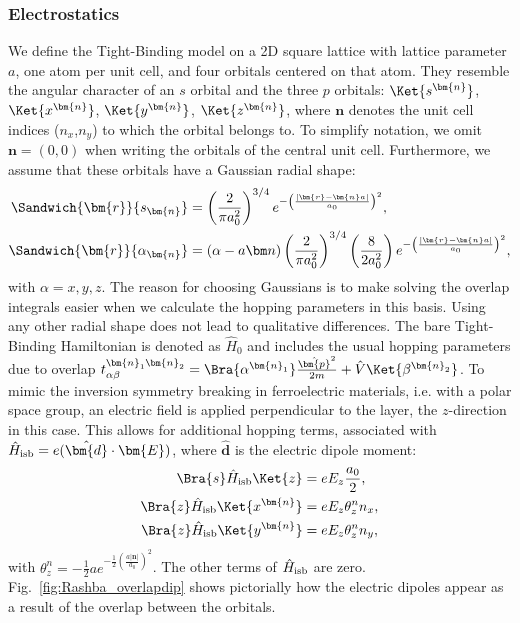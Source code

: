\subsubsection{Electrostatics \label{sec:tb_model}}
We define the Tight-Binding model on a 2D square lattice with lattice parameter $a$, one atom per unit cell, and four orbitals centered on that atom.
They resemble the angular character of an $s$ orbital and the three $p$ orbitals: $\Ket{s^{\bm{n}}}$, $\Ket{x^{\bm{n}}}$, $\Ket{y^{\bm{n}}}$, $\Ket{z^{\bm{n}}}$, where $\bm{n}$ denotes the unit cell indices ($n_x$,$n_y$) to which the orbital belongs to.
To simplify notation, we omit $\bm{n} = (0, 0)$ when writing the orbitals of the central unit cell.
Furthermore, we assume that these orbitals have a Gaussian radial shape:
\begin{align}
	\Sandwich{\bm{r}}{s_{\bm{n}}} &= \left(\frac{2}{\pi a_0^2}\right)^{3/4}e^{-\left(\frac{|\bm{r}-\bm{n}a|}{a_0}\right)^2},\\
\Sandwich{\bm{r}}{\alpha_{\bm{n}}} &= (\alpha - a\bm n)\left(\frac{2}{\pi a_0^2}\right)^{3/4}\left(\frac{8}{2a_0^2}\right) e^{-\left(\frac{|\bm{r}-\bm{n}a|}{a_0}\right)^2},
\end{align}
with $\alpha = x, y, z$.
The reason for choosing Gaussians is to make solving the overlap integrals easier when we calculate the hopping parameters in this basis.
Using any other radial shape does not lead to qualitative differences.
The bare Tight-Binding Hamiltonian is denoted as $\hat{H}_0$ and includes the usual hopping parameters due to overlap $t_{\alpha\beta}^{\bm{n}_1\bm{n}_2} = \Bra{\alpha^{\bm{n}_1}}\frac{\hat{\bm{p}}^2}{2m} + \hat{V}\Ket{\beta^{\bm{n}_2}}$.
To mimic the inversion symmetry breaking in ferroelectric materials, i.e. with a polar space group, an electric field is applied perpendicular to the layer, the $z$-direction in this case.
This allows for additional hopping terms, associated with $\hat{H}_{\rm isb} = e (\hat{\bm{d}}\cdot \bm{E})$, where $\hat{\bm{d}}$ is the electric dipole moment:
\begin{align}
	\label{eq:dipole}
	\Bra{s} \hat{H}_{\rm isb} \Ket{z} &=  e E_z \frac{a_0}{2},\\
	\Bra{z} \hat{H}_{\rm isb} \Ket{x^{\bm{n}}} &= e E_z \theta_z^n n_x,\\
	\Bra{z} \hat{H}_{\rm isb} \Ket{y^{\bm{n}}} &= e E_z \theta_z^n n_y,
\end{align}
with $\theta_z^n = -\frac{1}{2}ae^{-\frac{1}{2}\left(\frac{a|\bm{n}|}{a_0}\right)^2}$.
The other terms of $\hat{H}_{\rm isb}$ are zero.
Fig.~\ref{fig:Rashba_overlapdip} shows pictorially how the electric dipoles appear as a result of the overlap between the orbitals. 
